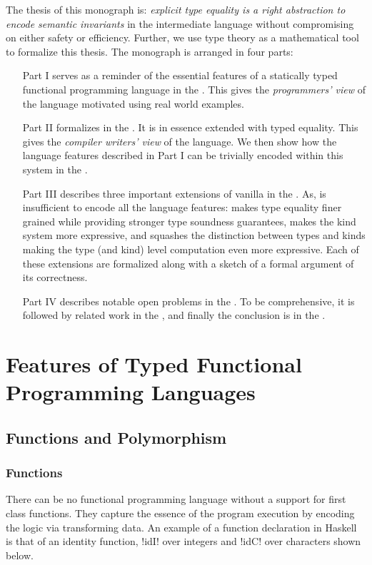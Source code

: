 \documentclass[screen,nonacm]{acmart}
\begin{document}
The thesis of this monograph is: \emph{explicit type equality is a
right abstraction to encode semantic invariants} in the
intermediate language without compromising on either safety or
efficiency. Further, we use type theory as a mathematical tool to
formalize this thesis. The monograph is arranged in four parts:
\begin{enumerate}
\item[Part I] serves as a reminder of the essential features
  of a statically typed functional programming language in the
  . This gives the \emph{programmers'
    view} of the language motivated using real world examples.
\item[Part II] formalizes \SFC in the . It is in essence
  \SF extended with typed equality. This gives the \emph{compiler
    writers' view} of the language. We then show how the language
  features described in Part I can be trivially encoded within this
  system in the .
\item[Part III] describes three important extensions of vanilla \SFC in
  the . As, \SFC is insufficient to encode all the
  language features: \SFR makes type equality finer grained while
  providing stronger type soundness guarantees, \SFP makes the kind
  system more expressive, and \SFK squashes the distinction between
  types and kinds making the type (and kind) level computation even
  more expressive. Each of these extensions are formalized along with
  a sketch of a formal argument of its correctness.
\item[Part IV] describes notable open problems in the .
  To be comprehensive, it is followed by related work in the
  , and finally the conclusion is in the
  .
\end{enumerate}

\label{part:I}
\section{Features of Typed Functional Programming Languages}\label{sec:language-features}%
\subsection{Functions and Polymorphism}
\subsubsection{Functions}
There can be no functional programming language without a support for first class
functions. They capture the essence of the program execution by encoding the logic via
transforming data. An example of a function declaration in Haskell is that of an identity
function, !idI! over integers and !idC! over characters shown below.
\end{document}
